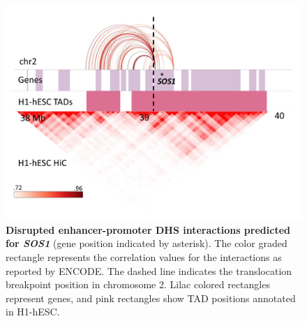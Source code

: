 \documentclass[a4paper,twoside=true,openright,parskip=full,chapterprefix=true,11pt,headings=normal,bibliography=totoc,listof=totoc,titlepage=on,captions=tableabove,draft=false]{scrreprt}
\theoremstyle{definition}
\theoremstyle{definition}
\theoremstyle{definition}
\theoremstyle{remark}
\begin{document}
\begin{figure}

{\centering \includegraphics[width=0.8\linewidth]{figures/position_effect/Figure3} 

}

\caption{\textbf{Disrupted enhancer-promoter DHS
interactions predicted for \emph{SOS1} } (gene position indicated by
asterisk). The color graded rectangle represents the correlation values
for the interactions as reported by ENCODE. The dashed line indicates
the translocation breakpoint position in chromosome 2. Lilac colored
rectangles represent genes, and pink rectangles show TAD positions
annotated in H1-hESC.}\label{fig:position-effect-3}
\end{figure}
\end{document}

